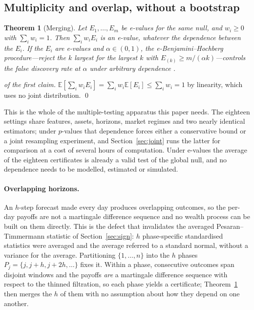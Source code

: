 \documentclass{article}
\theoremstyle{plain}
\newtheorem{theorem}{Theorem}
\theoremstyle{definition}
\begin{document}
\subsection{Multiplicity and overlap, without a bootstrap}
\label{sec:merge}

\begin{theorem}[Merging]
\label{thm:merge}
Let $E_1,\dots,E_m$ be e-values for the same null, and $w_i\ge0$ with $\sum_iw_i=1$. Then
$\sum_iw_iE_i$ is an e-value, \emph{whatever the dependence between the $E_i$}. If the
$E_i$ are e-values and $\alpha\in(0,1)$, the e-Benjamini--Hochberg procedure---reject the
$k$ largest for the largest $k$ with $E_{(k)}\ge m/(\alpha k)$---controls the false
discovery rate at $\alpha$ under arbitrary dependence \citep{wang2022}.
\end{theorem}

\begin{proof}[of the first claim]
$\mathbb{E}[\sum_iw_iE_i]=\sum_iw_i\mathbb{E}[E_i]\le\sum_iw_i=1$ by linearity, which uses
no joint distribution. \qed
\end{proof}

This is the whole of the multiple-testing apparatus this paper needs. The eighteen settings
share features, assets, horizons, market regimes and two nearly identical estimators; under
$p$-values that dependence forces either a conservative bound or a joint resampling
experiment, and Section~\ref{sec:joint} runs the latter for comparison at a cost of several
hours of computation. Under e-values the average of the eighteen certificates is already a
valid test of the global null, and no dependence needs to be modelled, estimated or
simulated.

\paragraph{Overlapping horizons.} An $h$-step forecast made every day produces overlapping
outcomes, so the per-day payoffs are not a martingale difference sequence and no wealth
process can be built on them directly. This is the defect that invalidates the averaged
Pesaran--Timmermann statistic of Section~\ref{sec:sign}: $h$ phase-specific standardised
statistics were averaged and the average referred to a standard normal, without a variance
for the average. Partitioning $\{1,\dots,n\}$ into the $h$ phases
$P_j=\{j,j+h,j+2h,\dots\}$ fixes it. Within a phase, consecutive outcomes span disjoint
windows and the payoffs \emph{are} a martingale difference sequence with respect to the
thinned filtration, so each phase yields a certificate; Theorem~\ref{thm:merge} then merges
the $h$ of them with no assumption about how they depend on one another.
\end{document}
